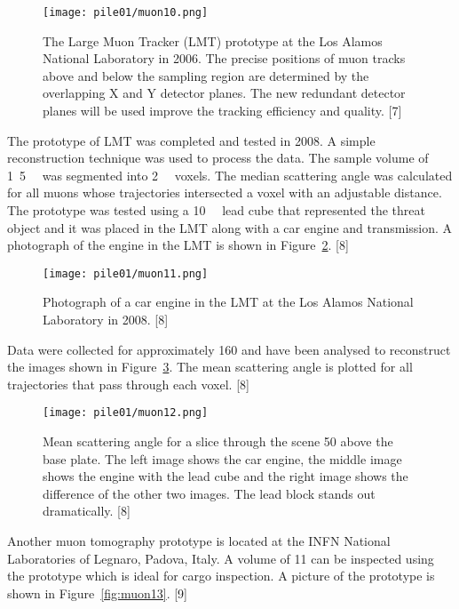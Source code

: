 \documentclass[twoside,titlepage,11pt,twocolumn,a4paper]{article}
\begin{document}
\begin{figure}
  \texttt{[image: pile01/muon10.png]}
  \caption{The Large Muon Tracker (LMT) prototype at the Los Alamos
    National Laboratory in 2006.  The precise positions of muon tracks
    above and below the sampling region are determined by the
    overlapping X and Y detector planes. The new redundant detector
    planes will be used improve the tracking efficiency and
    quality. [7]}
  \label{fig:muon10}
\end{figure}

The prototype of LMT was completed and tested in 2008. A simple
reconstruction technique was used to process the data. The sample
volume of \unit{1.5}{\cubic\metre} was segmented
into \unit{2}{\cubic{\centi\metre}} voxels. The median
scattering angle was calculated for all muons whose trajectories
intersected a voxel with an adjustable distance. The prototype was
tested using a \unit{10}{\cubic{\centi\metre}} lead
cube that represented the threat object and it was placed in the LMT
along with a car engine and transmission.  A photograph of the engine
in the LMT is shown in Figure~\ref{fig:muon11}. [8]

\begin{figure}
  \texttt{[image: pile01/muon11.png]}
  \caption{Photograph of a car engine in the LMT at the Los Alamos
    National Laboratory in 2008. [8]}
  \label{fig:muon11}
\end{figure}

Data were collected for approximately \unit{160}{\minute} and have
been analysed to reconstruct the images shown in
Figure~\ref{fig:muon12}. The mean scattering angle is plotted for all
trajectories that pass through each voxel. [8]

\begin{figure}
  \texttt{[image: pile01/muon12.png]}
  \caption{Mean scattering angle for a slice through the scene
    \unit{50}{\centi\metre} above the base plate. The left image shows
    the car engine, the middle image shows the engine with the lead
    cube and the right image shows the difference of the other two
    images. The lead block stands out dramatically. [8]}
  \label{fig:muon12}
\end{figure}

Another muon tomography prototype is located at the INFN National
Laboratories of Legnaro, Padova, Italy. A volume of
\unit{11}{\cubic\metre} can be inspected using the prototype which is
ideal for cargo inspection. A picture of the prototype is shown in
Figure~\ref{fig:muon13}. [9]
\end{document}
